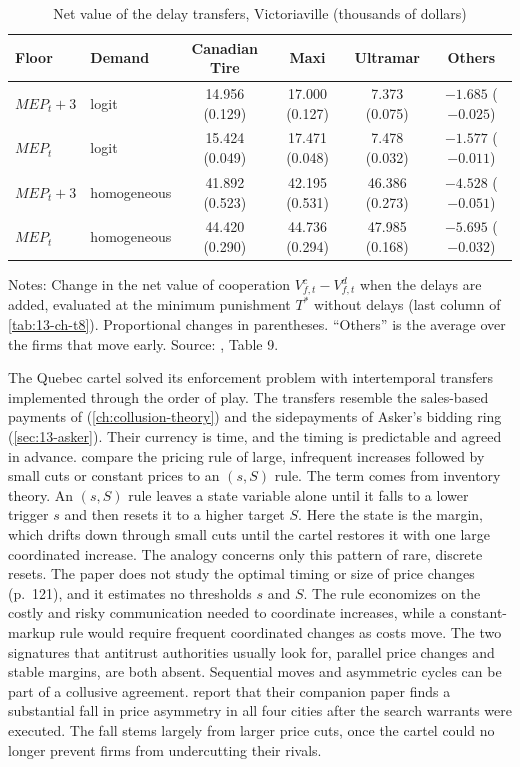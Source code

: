 \begin{table}[htbp]
\centering
\caption{Net value of the delay transfers, Victoriaville (thousands of dollars)}\label{tab:13-ch-t9}
\small
\begin{tabular}{llcccc}
\toprule
Floor & Demand & Canadian Tire & Maxi & Ultramar & Others\\
\midrule
$\textit{MEP}_t+3$ & logit & 14.956 (0.129) & 17.000 (0.127) & 7.373 (0.075) & $-1.685$ ($-0.025$)\\
$\textit{MEP}_t$ & logit & 15.424 (0.049) & 17.471 (0.048) & 7.478 (0.032) & $-1.577$ ($-0.011$)\\
$\textit{MEP}_t+3$ & homogeneous & 41.892 (0.523) & 42.195 (0.531) & 46.386 (0.273) & $-4.528$ ($-0.051$)\\
$\textit{MEP}_t$ & homogeneous & 44.420 (0.290) & 44.736 (0.294) & 47.985 (0.168) & $-5.695$ ($-0.032$)\\
\bottomrule
\end{tabular}

\smallskip
\begin{minipage}{0.92\textwidth}\footnotesize
Notes: Change in the net value of cooperation $V^c_{f,t}-V^d_{f,t}$ when the delays are added, evaluated at the minimum
punishment $T^*$ without delays (last column of \cref{tab:13-ch-t8}). Proportional changes in parentheses. ``Others'' is the
average over the firms that move early. Source: \citet{ClarkHoude2013}, Table 9.
\end{minipage}
\end{table}

The Quebec cartel solved its enforcement problem with intertemporal transfers implemented through the order of play. The
transfers resemble the sales-based payments of \citet{HarringtonSkrzypacz2011} (\cref{ch:collusion-theory}) and the sidepayments
of Asker's bidding ring (\cref{sec:13-asker}). Their currency is time, and the timing is predictable and agreed in advance. 
compare the pricing rule of large, infrequent increases followed by small cuts or constant prices to an $(s,S)$ rule. The term comes from inventory theory. An $(s,S)$ rule leaves a state variable alone until it falls to a lower trigger
$s$ and then resets it to a higher target $S$. Here the state is the margin, which drifts down through small cuts until the
cartel restores it with one large coordinated increase. The analogy concerns only this pattern of rare, discrete resets. The
paper does not study the optimal timing or size of price changes (p.~121), and it estimates no thresholds $s$ and $S$. The
rule economizes on the costly and risky communication needed to coordinate increases, while a constant-markup rule would
require frequent coordinated changes as costs move. The two signatures that antitrust authorities usually look for, parallel price changes and stable
margins, are both absent. Sequential moves and asymmetric cycles can be part of a collusive agreement.
\citet[p.~121]{ClarkHoude2013} report that their companion paper \citep{ClarkHoude2014} finds a substantial fall in price
asymmetry in all four cities after the search warrants were executed. The fall stems largely from larger price cuts, once the cartel
could no longer prevent firms from undercutting their rivals.

